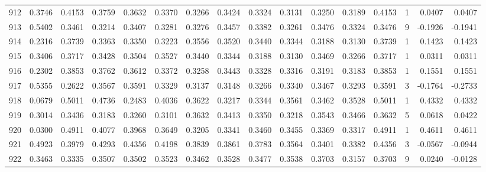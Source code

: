 \begin{tabular}{lrrrrrrrrrrrrrrr}
912 &      0.3746 &  0.4153 &  0.3759 &  0.3632 &  0.3370 &  0.3266 &  0.3424 &  0.3324 &  0.3131 &  0.3250 &   0.3189 &     0.4153 &      1 &                    0.0407 &                     0.0407 \\
913 &      0.5402 &  0.3461 &  0.3214 &  0.3407 &  0.3281 &  0.3276 &  0.3457 &  0.3382 &  0.3261 &  0.3476 &   0.3324 &     0.3476 &      9 &                   -0.1926 &                    -0.1941 \\
914 &      0.2316 &  0.3739 &  0.3363 &  0.3350 &  0.3223 &  0.3556 &  0.3520 &  0.3440 &  0.3344 &  0.3188 &   0.3130 &     0.3739 &      1 &                    0.1423 &                     0.1423 \\
915 &      0.3406 &  0.3717 &  0.3428 &  0.3504 &  0.3527 &  0.3440 &  0.3344 &  0.3188 &  0.3130 &  0.3469 &   0.3266 &     0.3717 &      1 &                    0.0311 &                     0.0311 \\
916 &      0.2302 &  0.3853 &  0.3762 &  0.3612 &  0.3372 &  0.3258 &  0.3443 &  0.3328 &  0.3316 &  0.3191 &   0.3183 &     0.3853 &      1 &                    0.1551 &                     0.1551 \\
917 &      0.5355 &  0.2622 &  0.3567 &  0.3591 &  0.3329 &  0.3137 &  0.3148 &  0.3266 &  0.3340 &  0.3467 &   0.3293 &     0.3591 &      3 &                   -0.1764 &                    -0.2733 \\
918 &      0.0679 &  0.5011 &  0.4736 &  0.2483 &  0.4036 &  0.3622 &  0.3217 &  0.3344 &  0.3561 &  0.3462 &   0.3528 &     0.5011 &      1 &                    0.4332 &                     0.4332 \\
919 &      0.3014 &  0.3436 &  0.3183 &  0.3260 &  0.3101 &  0.3632 &  0.3413 &  0.3350 &  0.3218 &  0.3543 &   0.3466 &     0.3632 &      5 &                    0.0618 &                     0.0422 \\
920 &      0.0300 &  0.4911 &  0.4077 &  0.3968 &  0.3649 &  0.3205 &  0.3341 &  0.3460 &  0.3455 &  0.3369 &   0.3317 &     0.4911 &      1 &                    0.4611 &                     0.4611 \\
921 &      0.4923 &  0.3979 &  0.4293 &  0.4356 &  0.4198 &  0.3839 &  0.3861 &  0.3783 &  0.3564 &  0.3401 &   0.3382 &     0.4356 &      3 &                   -0.0567 &                    -0.0944 \\
922 &      0.3463 &  0.3335 &  0.3507 &  0.3502 &  0.3523 &  0.3462 &  0.3528 &  0.3477 &  0.3538 &  0.3703 &   0.3157 &     0.3703 &      9 &                    0.0240 &                    -0.0128 \\

\end{tabular}
